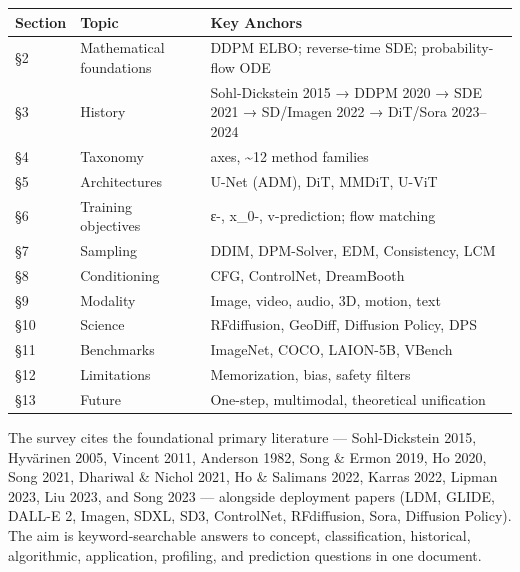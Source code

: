 {\def\LTcaptype{none} %
\begin{longtable}[]{@{}
  >{\raggedright\arraybackslash}p{}
  >{\raggedright\arraybackslash}p{}
  >{\raggedright\arraybackslash}p{}@{}}
\toprule\noalign{}
\begin{minipage}[b]{\linewidth}\raggedright
Section
\end{minipage} & \begin{minipage}[b]{\linewidth}\raggedright
Topic
\end{minipage} & \begin{minipage}[b]{\linewidth}\raggedright
Key Anchors
\end{minipage} \\
\midrule\noalign{}
\endhead
\bottomrule\noalign{}
\endlastfoot
§2 & Mathematical foundations & DDPM ELBO; reverse-time SDE; probability-flow ODE \\
§3 & History & Sohl-Dickstein 2015 → DDPM 2020 → SDE 2021 → SD/Imagen 2022 → DiT/Sora 2023--2024 \\
§4 & Taxonomy & 5 axes, \textasciitilde12 method families \\
§5 & Architectures & U-Net (ADM), DiT, MMDiT, U-ViT \\
§6 & Training objectives & ε-, x\_0-, v-prediction; flow matching \\
§7 & Sampling & DDIM, DPM-Solver, EDM, Consistency, LCM \\
§8 & Conditioning & CFG, ControlNet, DreamBooth \\
§9 & Modality & Image, video, audio, 3D, motion, text \\
§10 & Science & RFdiffusion, GeoDiff, Diffusion Policy, DPS \\
§11 & Benchmarks & ImageNet, COCO, LAION-5B, VBench \\
§12 & Limitations & Memorization, bias, safety filters \\
§13 & Future & One-step, multimodal, theoretical unification \\
\end{longtable}
}

The survey cites the foundational primary literature --- Sohl-Dickstein 2015, Hyvärinen 2005, Vincent 2011, Anderson 1982, Song \& Ermon 2019, Ho 2020, Song 2021, Dhariwal \& Nichol 2021, Ho \& Salimans 2022, Karras 2022, Lipman 2023, Liu 2023, and Song 2023 --- alongside deployment papers (LDM, GLIDE, DALL-E 2, Imagen, SDXL, SD3, ControlNet, RFdiffusion, Sora, Diffusion Policy). The aim is keyword-searchable answers to concept, classification, historical, algorithmic, application, profiling, and prediction questions in one document.

